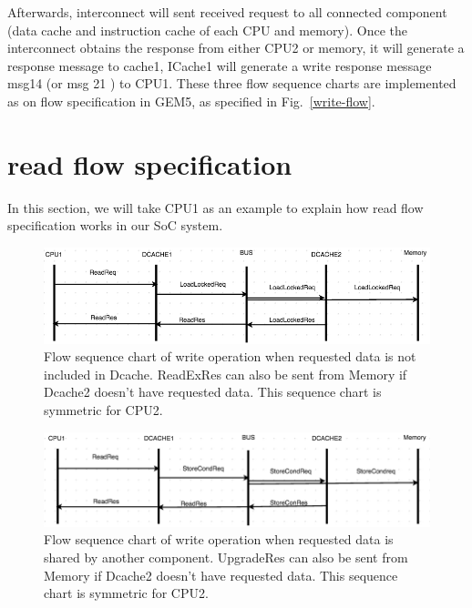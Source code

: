 \documentclass[conference]{IEEEtran}
\begin{document}
 Afterwards, interconnect will sent received request to all connected component (data cache and instruction cache of each CPU and memory). Once the interconnect obtains the response from either CPU2 or memory, it will generate a response message to cache1, ICache1 will generate a write response message msg14 (or msg 21 ) to CPU1. These three flow sequence charts are implemented as on flow specification in GEM5, as specified in Fig.~\ref{write-flow}.
 
 
 
 \section{read flow specification}
 In this section, we will take CPU1 as an example to explain how read flow specification works in our SoC system.


 
 \begin{figure} 
 \centerline{
 \includegraphics[width=3.9In]{figures/read3.png}}
 \caption{Flow sequence chart of write operation when requested data is not included in Dcache. ReadExRes can also be sent from Memory if Dcache2 doesn't have requested data. This sequence chart is symmetric for CPU2. }
 \label{read3}
 \end{figure}
 
 \begin{figure} 
 \centerline{
 \includegraphics[width=3.9In]{figures/read2.png}}
 \caption{Flow sequence chart of write operation when requested data is shared by another component. UpgradeRes can also be sent from Memory if Dcache2 doesn't have requested data. This sequence chart is symmetric for CPU2. }
 \label{read2}
 \end{figure}
\end{document}
